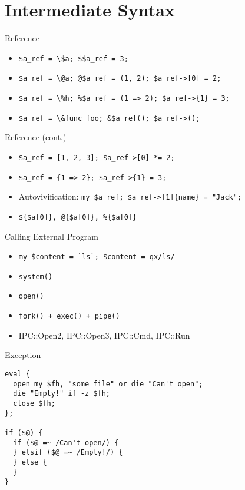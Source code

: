 \documentclass{beamer}
\begin{document}
\section{Intermediate Syntax}

\begin{frame}[containsverbatim]{Reference}
  \begin{itemize}
    \item \lstinline{$a_ref = \$a; $$a_ref = 3;}
    \item \lstinline{$a_ref = \@a; @$a_ref = (1, 2); $a_ref->[0] = 2;}
    \item \lstinline!$a_ref = \%h; %$a_ref = (1 => 2); $a_ref->{1} = 3;!
    \item \lstinline!$a_ref = \&func_foo; &$a_ref(); $a_ref->();!
  \end{itemize}
\end{frame}

\begin{frame}[containsverbatim]{Reference (cont.)}
  \begin{itemize}
    \item \lstinline{$a_ref = [1, 2, 3]; $a_ref->[0] *= 2;}
    \item \lstinline!$a_ref = {1 => 2}; $a_ref->{1} = 3;!
    \item Autovivification: \lstinline!my $a_ref; $a_ref->[1]{name} = "Jack";!
    \item \lstinline!${$a[0]}, @{$a[0]}, %{$a[0]}!
  \end{itemize}
\end{frame}

\begin{frame}[containsverbatim]{Calling External Program}
  \begin{itemize}
    \item \lstinline{my $content = `ls`; $content = qx/ls/}
    \item \lstinline{system()}
    \item \lstinline{open()}
    \item \lstinline{fork() + exec() + pipe()}
    \item IPC::Open2, IPC::Open3, IPC::Cmd, IPC::Run
  \end{itemize}
\end{frame}

\begin{frame}[containsverbatim]{Exception}
\begin{lstlisting}[caption=Vanilla exception processing]
eval {
  open my $fh, "some_file" or die "Can't open";
  die "Empty!" if -z $fh;
  close $fh;
};

if ($@) {
  if ($@ =~ /Can't open/) {
  } elsif ($@ =~ /Empty!/) {
  } else {
  }
}
\end{lstlisting}
\end{frame}
\end{document}
